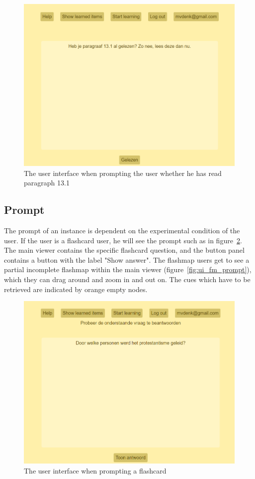 \begin{figure}
    \centering
    \includegraphics[width=.8\textwidth]{img/ui_read_request.png}
    \caption{The user interface when prompting the user whether he has read paragraph 13.1}
    \label{fig:ui_read_request}
\end{figure}

\subsection{Prompt}

The prompt of an instance is dependent on the experimental condition of the user. If the user is a flashcard user, he will see the prompt such as in figure~\ref{fig:ui_fc_prompt}. The main viewer contains the specific flashcard question, and the button panel contains a button with the label "Show answer". The flashmap users get to see a partial incomplete flashmap within the main viewer (figure~\ref{fig:ui_fm_prompt}), which they can drag around and zoom in and out on. The cues which have to be retrieved are indicated by orange empty nodes.

\begin{figure}
    \centering
    \includegraphics[width=.8\textwidth]{img/ui_fc_prompt.png}
    \caption{The user interface when prompting a flashcard}
    \label{fig:ui_fc_prompt}
\end{figure}

